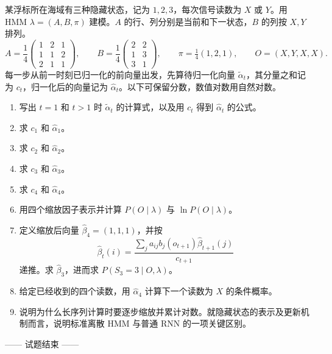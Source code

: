 某浮标所在海域有三种隐藏状态，记为 $1,2,3$，每次信号读数为 $X$ 或 $Y$。用 HMM $\lambda=(A,B,\pi)$ 建模。$A$ 的行、列分别是当前和下一状态，$B$ 的列按 $X,Y$ 排列。
\[
 A=\frac14\begin{pmatrix}1&2&1\\1&1&2\\2&1&1\end{pmatrix},\qquad
 B=\frac14\begin{pmatrix}2&2\\1&3\\3&1\end{pmatrix},\qquad
 \pi=\tfrac14(1,2,1),\qquad O=(X,Y,X,X).
\]
每一步从前一时刻已归一化的前向量出发，先算待归一化向量 $\widetilde\alpha_t$，其分量之和记为 $c_t$，归一化后的向量记为 $\widehat\alpha_t$。以下可保留分数，数值对数用自然对数。
\begin{enumerate}[label=(\arabic*)]
\item 写出 $t=1$ 和 $t>1$ 时 $\widetilde\alpha_t$ 的计算式，以及用 $c_t$ 得到 $\widehat\alpha_t$ 的公式。
\item 求 $c_1$ 和 $\widehat\alpha_1$。
\item 求 $c_2$ 和 $\widehat\alpha_2$。
\item 求 $c_3$ 和 $\widehat\alpha_3$。
\item 求 $c_4$ 和 $\widehat\alpha_4$。
\item 用四个缩放因子表示并计算 $P(O\mid\lambda)$ 与 $\ln P(O\mid\lambda)$。
\item 定义缩放后向量 $\widehat\beta_4=(1,1,1)$，并按
\[
 \widehat\beta_t(i)=\frac{\sum_j a_{ij}b_j(o_{t+1})\widehat\beta_{t+1}(j)}{c_{t+1}}
\]
递推。求 $\widehat\beta_3$，进而求 $P(S_3=3\mid O,\lambda)$。
\item 给定已经收到的四个读数，用 $\widehat\alpha_4$ 计算下一个读数为 $X$ 的条件概率。
\item 说明为什么长序列计算时要逐步缩放并累计对数。就隐藏状态的表示及更新机制而言，说明标准离散 HMM 与普通 RNN 的一项关键区别。
\end{enumerate}

\vfill \begin{center} —— 试题结束 ——\end{center}
